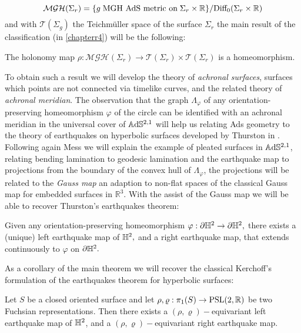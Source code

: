 \[
    \mathcal{MGH}(\Sigma_r)=\{g\;\text{MGH AdS metric on}\;\Sigma_r\times\mathbb{R}\}/\text{Diff}_0(\Sigma_r\times\mathbb{R})
\] and with $\mathcal{T}(\Sigma_g)$ the Teichmüller space of the surface $\Sigma_r$ the main result of the classification (in \ref{chapterr4}) will be the following: 

\begin{theorem}
    The holonomy map $\rho:\mathcal{MGH}(\Sigma_r)\to\mathcal{T}(\Sigma_r)\times\mathcal{T}(\Sigma_r)$ is a homeomorphism.
\end{theorem}

To obtain such a result we will develop the theory of \textit{achronal surfaces}, surfaces which points are not connected via timelike curves, and the related theory of \textit{achronal meridian}. The observation that the graph $\Lambda_\varphi$ of any orientation-preserving homeomorphism $\varphi$ of the circle can be identified with an achronal meridian in the universal cover of $\mathbb{A}\mathrm{d}\mathbb{S}^{2,1}$ will help us relating Ads geometry to the theory of earthquakes on hyperbolic surfaces developed by Thurston in \cite{thurston1986earthquakes}.\\ 

Following again Mess we will explain the example of pleated surfaces in $\mathbb{A}\mathrm{d}\mathbb{S}^{2,1}$, relating bending lamination to geodesic lamination and the earthquake map to projections from the boundary of the convex hull of $\Lambda_\varphi$, the projections will be related to the \textit{Gauss map} an adaption to non-flat spaces of the classical Gauss map for embedded surfaces in $\mathbb{R}^3.$ With the assist of the Gauss map we will be able to recover Thurston's earthquakes theorem: 

\begin{theorem}
    Given any orientation-preserving homeomorphism $\varphi:\partial\mathbb{H}^2\to\partial\mathbb{H}^2,$ there exists a (unique) left earthquake map of $\mathbb{H}^2,$ and a right earthquake map, that extends continuously to $\varphi$ on $\partial\mathbb{H}^2.$
\end{theorem}

\noindent As a corollary of the main theorem we will recover the classical Kerchoff's formulation of the earthquakes theorem for hyperbolic surfaces: 

\begin{corollary}
    Let $S$ be a closed oriented surface and let $\rho,\varrho:\pi_1(S)\to\text{PSL}(2,\mathbb{R})$ be two Fuchsian representations. Then there exists a $(\rho,\varrho)-$equivariant left earthquake map of $\mathbb{H}^2$, and a $(\rho,\varrho)-$equivariant right earthquake map. 
\end{corollary}